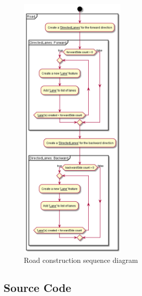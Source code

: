 \begin{figure}[h!]
  	\caption{Road construction sequence diagram}
  	\label{fig:roadConstructSeqDiag}
  	\centering
  	\includegraphics[width=0.45\textwidth]{figs/graphConstruction/RoadConstruction.png}
\end{figure}

\subsection{Source Code}